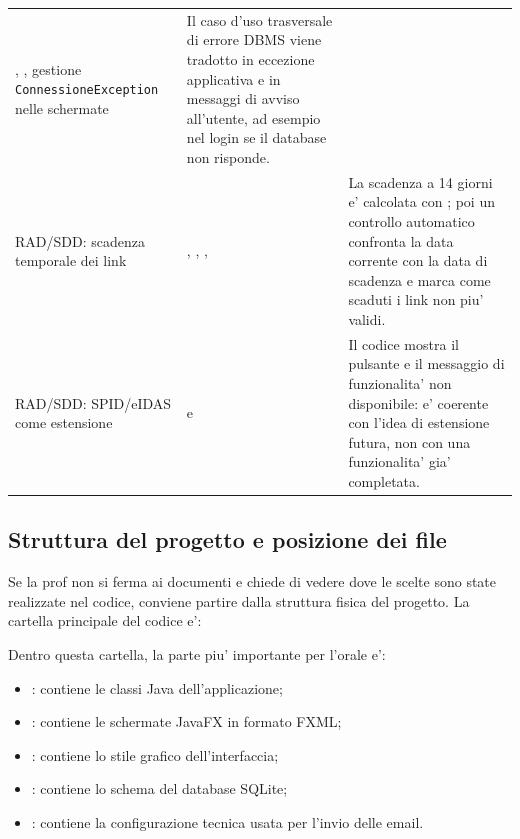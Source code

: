 ﻿\documentclass[11pt,a4paper]{article}
\begin{document}
{\begin{longtable}{L{3.0cm}L{5.4cm}L{5.7cm}}
, ,
gestione \texttt{ConnessioneException} nelle schermate &
Il caso d'uso trasversale di errore DBMS viene tradotto in eccezione applicativa e in
messaggi di avviso all'utente, ad esempio nel login se il database non risponde. \\
RAD/SDD: scadenza temporale dei link &
, ,
,  &
La scadenza a 14 giorni e' calcolata con ;
poi un controllo automatico confronta la data corrente con la data di scadenza e marca
come scaduti i link non piu' validi. \\
RAD/SDD: SPID/eIDAS come estensione &
 e  &
Il codice mostra il pulsante e il messaggio di funzionalita' non disponibile: e' coerente
con l'idea di estensione futura, non con una funzionalita' gia' completata. \\
\bottomrule
\end{longtable}
}

\subsection{Struttura del progetto e posizione dei file}

Se la prof non si ferma ai documenti e chiede di vedere dove le scelte sono state
realizzate nel codice, conviene partire dalla struttura fisica del progetto. La cartella
principale del codice e':
\begin{center}
\end{center}
Dentro questa cartella, la parte piu' importante per l'orale e':
\begin{itemize}
  \item {}: contiene le classi Java dell'applicazione;
  \item {}: contiene le schermate JavaFX in formato FXML;
  \item {}: contiene lo stile grafico dell'interfaccia;
  \item {}: contiene lo schema del database SQLite;
  \item {}: contiene la configurazione tecnica
  usata per l'invio delle email.
\end{itemize}
\end{document}
